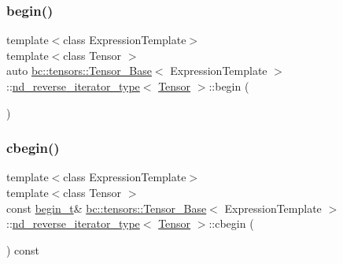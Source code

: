 \subsubsection{\texorpdfstring{begin()}{begin()}}
{\footnotesize\ttfamily template$<$class Expression\+Template$>$ \\
template$<$class Tensor $>$ \\
auto \hyperlink{classbc_1_1tensors_1_1Tensor__Base}{bc\+::tensors\+::\+Tensor\+\_\+\+Base}$<$ Expression\+Template $>$\+::\hyperlink{structbc_1_1tensors_1_1Tensor__Base_1_1nd__reverse__iterator__type}{nd\+\_\+reverse\+\_\+iterator\+\_\+type}$<$ \hyperlink{namespacebc_a659391e47ab612be3ba6c18cf9c89159}{Tensor} $>$\+::begin (\begin{DoxyParamCaption}{ }\end{DoxyParamCaption})\hspace{0.3cm}{\ttfamily [inline]}}

\mbox{\label{structbc_1_1tensors_1_1Tensor__Base_1_1nd__reverse__iterator__type_a98763fd850991ae08b248c1eef07f155}} 
\subsubsection{\texorpdfstring{cbegin()}{cbegin()}}
{\footnotesize\ttfamily template$<$class Expression\+Template$>$ \\
template$<$class Tensor $>$ \\
const \hyperlink{structbc_1_1tensors_1_1Tensor__Base_1_1nd__reverse__iterator__type_ae1257b60d15e216d87339e89db5df9bc}{begin\+\_\+t}\& \hyperlink{classbc_1_1tensors_1_1Tensor__Base}{bc\+::tensors\+::\+Tensor\+\_\+\+Base}$<$ Expression\+Template $>$\+::\hyperlink{structbc_1_1tensors_1_1Tensor__Base_1_1nd__reverse__iterator__type}{nd\+\_\+reverse\+\_\+iterator\+\_\+type}$<$ \hyperlink{namespacebc_a659391e47ab612be3ba6c18cf9c89159}{Tensor} $>$\+::cbegin (\begin{DoxyParamCaption}{ }\end{DoxyParamCaption}) const\hspace{0.3cm}{\ttfamily [inline]}}

